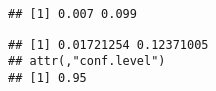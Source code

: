 \documentclass[]{article}
\newenvironment{Shaded}{\begin{snugshade}}{\end{snugshade}}
\newcommand{\DataTypeTok}[1]{\textcolor[rgb]{0.13,0.29,0.53}{#1}}
\newcommand{\FloatTok}[1]{\textcolor[rgb]{0.00,0.00,0.81}{#1}}
\newcommand{\KeywordTok}[1]{\textcolor[rgb]{0.13,0.29,0.53}{\textbf{#1}}}
\newcommand{\NormalTok}[1]{#1}
\newcommand{\OperatorTok}[1]{\textcolor[rgb]{0.81,0.36,0.00}{\textbf{#1}}}
\begin{document}
\begin{verbatim}
## [1] 0.007 0.099
\end{verbatim}

\begin{Shaded}
\end{Shaded}

\begin{verbatim}
## [1] 0.01721254 0.12371005
## attr(,"conf.level")
## [1] 0.95
\end{verbatim}
\end{document}
